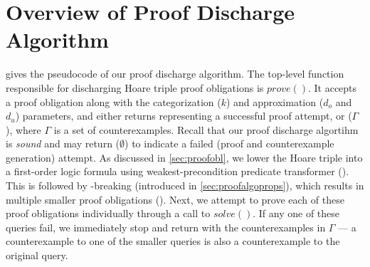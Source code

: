\section{Overview of Proof Discharge Algorithm}
\label{sec:proofsummary}
 gives the pseudocode of our proof discharge algorithm.
The top-level function responsible for discharging Hoare triple proof obligations is $prove()$.
It accepts a proof obligation along with the categorization ($k$) and approximation ($d_o$ and $d_u$) parameters,
and either returns  representing a successful proof attempt, or ($\Gamma$),
where $\Gamma$ is a set of counterexamples.
Recall that our proof discharge algortihm is {\em sound} and may return ($\emptyset$)
to indicate a failed (proof and counterexample generation) attempt.
As discussed in \cref{sec:proofobl}, we lower the Hoare triple into a first-order logic
formula using weakest-precondition predicate transformer ().
This is followed by \rhs{}-breaking (introduced in \cref{sec:proofalgoprops}),
which results in multiple smaller proof obligations ().
Next, we attempt to prove each of these proof obligations individually through a call to $solve()$.
If any one of these queries fail, we immediately stop and return  with the
counterexamples in $\Gamma$ --- a counterexample to one of the smaller queries is also a counterexample
to the original query.

